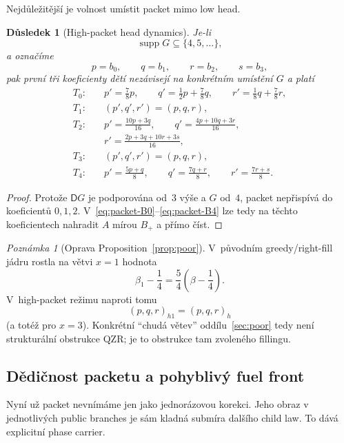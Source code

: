 \documentclass[11pt,a4paper]{article}
\newtheorem{corollary}[theorem]{Důsledek}
\theoremstyle{definition}
\theoremstyle{remark}
\newtheorem{remark}[theorem]{Poznámka}
\newcommand{\DOWN}{\mathsf D}
\newcommand{\supp}{\operatorname{supp}}
\begin{document}
Nejd\r ule\v zit\v ej\v s\'i je volnost um\'istit packet mimo low head.

\begin{corollary}[High-packet head dynamics]
\label{cor:high-packet}
Je-li
\[
\supp G\subseteq\{4,5,\dots\},
\]
a ozna\v c\'ime
\[
p=b_0,\qquad q=b_1,\qquad r=b_2,\qquad s=b_3,
\]
pak prvn\'i t\v ri koeficienty d\v et\'i nez\'avisej\'i na konkr\'etn\'im
um\'ist\v en\'i $G$ a plat\'i
\begin{align*}
T_0:\quad&
p'=\frac78p,\qquad
q'=\frac12p+\frac78q,\qquad
r'=\frac18q+\frac78r,\\[1mm]
T_1:\quad&
(p',q',r')=(p,q,r),\\[1mm]
T_2:\quad&
p'=\frac{10p+3q}{16},\qquad
q'=\frac{4p+10q+3r}{16},\\
&
r'=\frac{2p+3q+10r+3s}{16},\\[1mm]
T_3:\quad&
(p',q',r')=(p,q,r),\\[1mm]
T_4:\quad&
p'=\frac{5p+q}{8},\qquad
q'=\frac{7q+r}{8},\qquad
r'=\frac{7r+s}{8}.
\end{align*}
\end{corollary}

\begin{proof}
Proto\v ze $\DOWN G$ je podporov\'ana od~$3$ v\'y\v se a $G$ od~$4$,
packet nep\v risp\'iv\'a do koeficient\r u $0,1,2$.
V~\eqref{eq:packet-B0}--\eqref{eq:packet-B4} lze tedy na t\v echto
koeficientech nahradit $A$ m\'irou $B_+$ a p\v r\'imo \v c\'ist.
\end{proof}

\begin{remark}[Oprava Proposition~\ref{prop:poor}]
V~p\r uvodn\'im greedy/right-fill j\'adru rostla na v\v etvi $x=1$ hodnota
\[
\beta_1-\frac14=\frac54\left(\beta-\frac14\right).
\]
V~high-packet re\v zimu naproti tomu
\[
\boxed{(p,q,r)_{h1}=(p,q,r)_h}
\]
(a tot\'e\v z pro $x=3$).
Konkr\'etn\'i ``chud\'a v\v etev'' odd\'ilu~\ref{sec:poor} tedy nen\'i
struktur\'aln\'i obstrukce QZR; je to obstrukce tam zvolen\'eho fillingu.
\end{remark}

\subsection{D\v edi\v cnost packetu a pohybliv\'y fuel front}
\label{sec:packet-inheritance}

Nyn\'i u\v z packet nevn\'im\'ame jen jako jednor\'azovou korekci.
Jeho obraz v jednotliv\'ych public branches je s\'am kladn\'a subm\'ira
dal\v s\'iho child law. To d\'av\'a explicitn\'i phase carrier.
\end{document}
